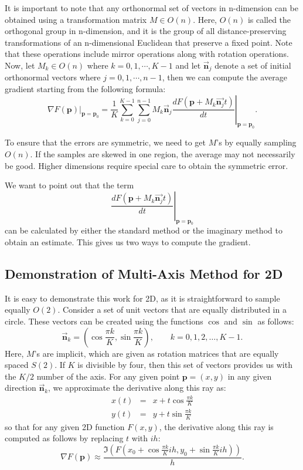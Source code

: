 \documentclass{article}
\begin{document}
It is important to note that any orthonormal set of vectors in n-dimension can be obtained using a transformation matrix $M \in O(n)$. Here, $O(n)$ is called the orthogonal group in n-dimension, and it is the group of all distance-preserving transformations of an n-dimensional Euclidean that preserve a fixed point. Note that these operations include mirror operations along with rotation operations. Now, let $M_k \in O(n)$ where $k=0,1,\cdots, K-1$ and let $\vec{\mathbf{n}}_j$ denote a set of initial orthonormal vectors where $j=0,1,\cdots, n-1$, then we can compute the average gradient starting from the following formula:
$$ 
\nabla F(\mathbf{p})|_{\mathbf{p}=\mathbf{p}_0} = \frac{1}{K} \sum_{k=0}^{K-1} \sum_{j=0}^{n-1} M_k\vec{\mathbf{n}}_j \left. \frac{dF(\mathbf{p} + M_k\vec{\mathbf{n}_j}t)}{dt} \right|_{\mathbf{p}=\mathbf{p}_0}. 
$$

To ensure that the errors are symmetric, we need to get $M$'s by equally sampling $O(n)$. If the samples are skewed in one region, the average may not necessarily be good. Higher dimensions require special care to obtain the symmetric error. 

We want to point out that the term
$$\left. \frac{dF(\mathbf{p} + M_k\vec{\mathbf{n}_j}t)}{dt} \right|_{\mathbf{p}=\mathbf{p}_0}$$
can be calculated by either the standard method or the imaginary method to obtain an estimate. This gives us two ways to compute the gradient. 

\subsection{Demonstration of Multi-Axis Method for 2D}
\label{sec_2DMulti-Axis}

It is easy to demonstrate this work for 2D, as it is straightforward to sample equally $O(2)$. Consider a set of unit vectors that are equally distributed in a circle. These vectors can be created using the functions $\cos$ and $\sin$ as follows:
$$\vec{\mathbf{n}}_k = \left( \cos \frac{\pi k }{K}, \sin \frac{\pi k }{K}  \right) , 
\qquad k = 0 , 1 , 2 , \ldots , K-1.$$
Here, $M$'s are implicit, which are given as rotation matrices that are equally spaced $S(2)$. 
If $K$ is divisible by four, then this set of vectors provides us with the $K/2$ number of the axis. 
For any given point $\mathbf{p}=(x,y)$ in any given direction $\vec{\mathbf{n}}_k$, we approximate the derivative along this ray as:
\begin{eqnarray}
x(t) &=& x + t \cos \frac{\pi k }{K} \nonumber \\
y(t) &=& y + t\sin \frac{\pi k }{K} \nonumber 
\end{eqnarray}
so that for any given 2D function $F(x,y)$, the derivative along this ray is computed as follows by replacing $t$ with $ih$: 
$$\nabla F(\mathbf{p})  \approx \frac{ \Im( F (x_0 + \cos \frac{ \pi k }{K} i h  ,  y_0 + \sin \frac{ \pi k}{K}  i h ))}{h} .$$
\end{document}
